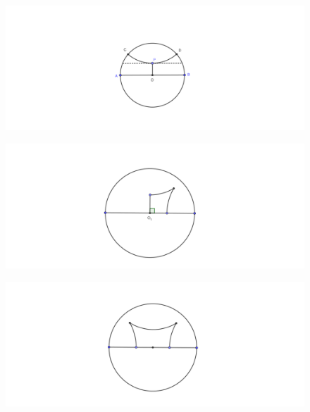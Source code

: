 \begin{figure}[ht]
\includegraphics[width=\textwidth]{Duong_song_song_phan_ky.pdf}
\end{figure}

\begin{figure}[ht]
\includegraphics[width=\textwidth]{Tu_giac_Lambert.pdf}
\end{figure}

\begin{figure}[ht]
\includegraphics[width=\textwidth]{Tu_giac_Saccheri.pdf}
\end{figure}	
	
	
	
